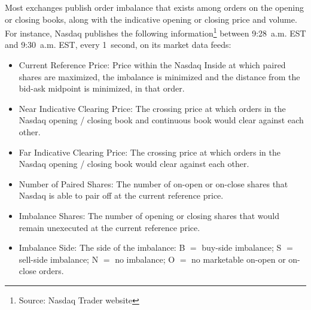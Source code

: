 Most exchanges publish order imbalance that exists among orders on the opening or closing books, along with the indicative opening or closing price and volume. For instance, Nasdaq publishes the following information\footnote{Source: Nasdaq Trader website} between 9:28~a.m. EST and 9:30~a.m. EST,  every 1~second, on its market data feeds:
        \begin{itemize}
        \item  Current Reference Price: Price within the Nasdaq Inside at which paired shares are maximized, the imbalance is minimized and the distance from the bid-ask midpoint is minimized, in that order.
        \item  Near Indicative Clearing Price: The crossing price at which orders in the Nasdaq opening / closing book and continuous book would clear against each other. 
        \item  Far Indicative Clearing Price: The crossing price at which orders in the Nasdaq opening / closing book would clear against each other. 
        \item  Number of Paired Shares: The number of on-open or on-close shares that Nasdaq is able to pair off at the current reference price. 
        \item  Imbalance Shares: The number of opening or closing shares that would remain unexecuted at the current reference price. 
        \item  Imbalance Side: The side of the imbalance: B $=$ buy-side imbalance; S $=$ sell-side imbalance; N $=$ no imbalance; O $=$ no marketable on-open or on-close orders.
        \end{itemize}



